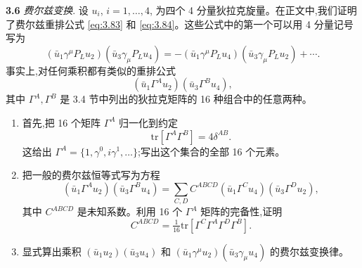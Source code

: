 \textbf{3.6} \emph{费尔兹变换}.  设 $u_i$, $i = 1, \ldots, 4$, 为四个 4 分量狄拉克旋量。在正文中,我们证明了费尔兹重排公式 \eqref{eq:3.83} 和 \eqref{eq:3.84}。这些公式中的第一个可以用 4 分量记号写为
\begin{equation}
  (\bar{u}_1\gamma^\mu P_L u_2)(\bar{u}_3\gamma_\mu P_L u_4)
    = -(\bar{u}_1\gamma^\mu P_L u_4)(\bar{u}_3\gamma_\mu P_L u_2)
      + \cdots .
\end{equation}
事实上,对任何乘积都有类似的重排公式
\begin{equation}
  (\bar{u}_1\Gamma^A u_2)(\bar{u}_3\Gamma^B u_4),
\end{equation}
其中 $\Gamma^A, \Gamma^B$ 是 3.4 节中列出的狄拉克矩阵的 16 种组合中的任意两种。
\begin{enumerate}[label=(\alph*)]
  \item 首先,把 16 个矩阵 $\Gamma^A$ 归一化到约定
    \begin{equation}
      \mathrm{tr}[\Gamma^A\Gamma^B] = 4\delta^{AB} .
    \end{equation}
    这给出 $\Gamma^A = \{1, \gamma^0, i\gamma^1, \ldots\}$;写出这个集合的全部 16 个元素。
  \item 把一般的费尔兹恒等式写为方程
    \begin{equation}
      (\bar{u}_1\Gamma^A u_2)(\bar{u}_3\Gamma^B u_4) =
        \sum_{C,D} C^{ABCD}(\bar{u}_1\Gamma^C u_4)(\bar{u}_3\Gamma^D u_2),
    \end{equation}
    其中 $C^{ABCD}$ 是未知系数。利用 16 个 $\Gamma^A$ 矩阵的完备性,证明
    \begin{equation}
      C^{ABCD} = \tfrac{1}{16}\mathrm{tr}[\Gamma^C\Gamma^A\Gamma^D\Gamma^B] .
    \end{equation}
  \item 显式算出乘积 $(\bar{u}_1u_2)(\bar{u}_3u_4)$ 和
    $(\bar{u}_1\gamma^\mu u_2)(\bar{u}_3\gamma_\mu u_4)$ 的费尔兹变换律。
\end{enumerate}

